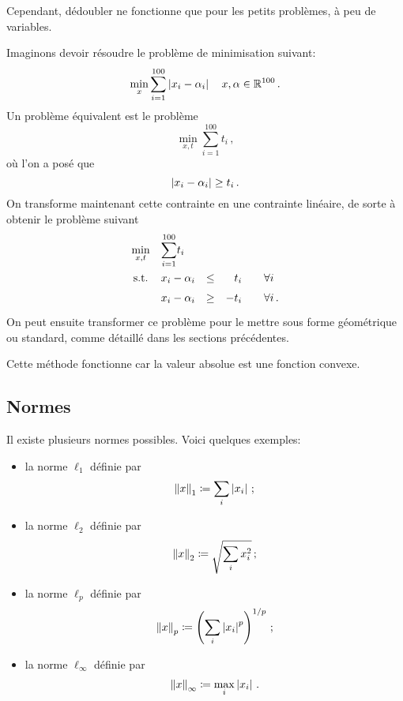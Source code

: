 	Cependant, dédoubler ne fonctionne que pour les petits problèmes,
	à peu de variables.

	Imaginons devoir résoudre le problème de minimisation suivant:
	\[
	\min_x \sum_{i=1}^{100} \left\lvert x_i - \alpha_i\right\lvert \quad x,\alpha \in \mathbb{R}^{100}\,.
	\]
	Un problème équivalent est le problème
	\[
	\min_{x,t} \sum_{i=1}^{100} t_i\,,
	\]
	où l'on a posé que
	\[
	\left\lvert x_i - \alpha_i\right\lvert \ge t_i\,.
	\]
	On transforme maintenant cette contrainte en une contrainte linéaire,
	de sorte à obtenir le problème suivant
	\[
	\renewcommand{\arraystretch}{1.5}
	\begin{array}{c@{\quad} l c r@{\qquad} l}
		\min\limits_{x,t} & {\displaystyle \sum_{i=1}^{100}} t_i &&&\\
		\textnormal{s.t.} & x_i - \alpha_i & \le & t_i & \forall i\\
		& x_i - \alpha_i & \ge & -t_i & \forall i\,.\\
	\end{array}
	\]
	On peut ensuite transformer ce problème
	pour le mettre sous forme géométrique ou standard,
	comme détaillé dans les sections précédentes.

	Cette méthode fonctionne car la valeur absolue est une fonction convexe.

\subsection{Normes}

	Il existe plusieurs normes possibles.
	Voici quelques exemples:

	\begin{itemize}
		\item la norme $\ell_1$ définie par
		\[
		\left\lVert x\right\rVert_1 \coloneqq \sum_i \left\lvert x_i\right\lvert\,;
		\]
		\item la norme $\ell_2$ définie par
		\[
		\left\lVert x\right\rVert_2 \coloneqq \sqrt{\sum_i x_i^2}\,;
		\]
		\item la norme $\ell_p$ définie par
		\[
		\left\lVert x\right\rVert_p \coloneqq \left(\sum_i \left\lvert x_i\right\lvert^p\right)^{1/p}\,;
		\]
		\item la norme $\ell_\infty$ définie par
		\[
		\left\lVert x\right\rVert_\infty \coloneqq \max_i \left\lvert x_i\right\lvert\,.
		\]
	\end{itemize}
